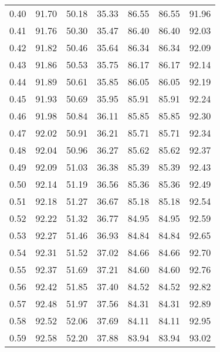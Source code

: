 \begin{tabular}{|c|c|c|c|c|c|c|}
      0.40 &     91.70 &     50.18 &      35.33 &   86.55 &      86.55 &         91.96 \\
      0.41 &     91.76 &     50.30 &      35.47 &   86.40 &      86.40 &         92.03 \\
      0.42 &     91.82 &     50.46 &      35.64 &   86.34 &      86.34 &         92.09 \\
      0.43 &     91.86 &     50.53 &      35.75 &   86.17 &      86.17 &         92.14 \\
      0.44 &     91.89 &     50.61 &      35.85 &   86.05 &      86.05 &         92.19 \\
      0.45 &     91.93 &     50.69 &      35.95 &   85.91 &      85.91 &         92.24 \\
      0.46 &     91.98 &     50.84 &      36.11 &   85.85 &      85.85 &         92.30 \\
      0.47 &     92.02 &     50.91 &      36.21 &   85.71 &      85.71 &         92.34 \\
      0.48 &     92.04 &     50.96 &      36.27 &   85.62 &      85.62 &         92.37 \\
      0.49 &     92.09 &     51.03 &      36.38 &   85.39 &      85.39 &         92.43 \\
      0.50 &     92.14 &     51.19 &      36.56 &   85.36 &      85.36 &         92.49 \\
      0.51 &     92.18 &     51.27 &      36.67 &   85.18 &      85.18 &         92.54 \\
      0.52 &     92.22 &     51.32 &      36.77 &   84.95 &      84.95 &         92.59 \\
      0.53 &     92.27 &     51.46 &      36.93 &   84.84 &      84.84 &         92.65 \\
      0.54 &     92.31 &     51.52 &      37.02 &   84.66 &      84.66 &         92.70 \\
      0.55 &     92.37 &     51.69 &      37.21 &   84.60 &      84.60 &         92.76 \\
      0.56 &     92.42 &     51.85 &      37.40 &   84.52 &      84.52 &         92.82 \\
      0.57 &     92.48 &     51.97 &      37.56 &   84.31 &      84.31 &         92.89 \\
      0.58 &     92.52 &     52.06 &      37.69 &   84.11 &      84.11 &         92.95 \\
      0.59 &     92.58 &     52.20 &      37.88 &   83.94 &      83.94 &         93.02 \\

\end{tabular}

